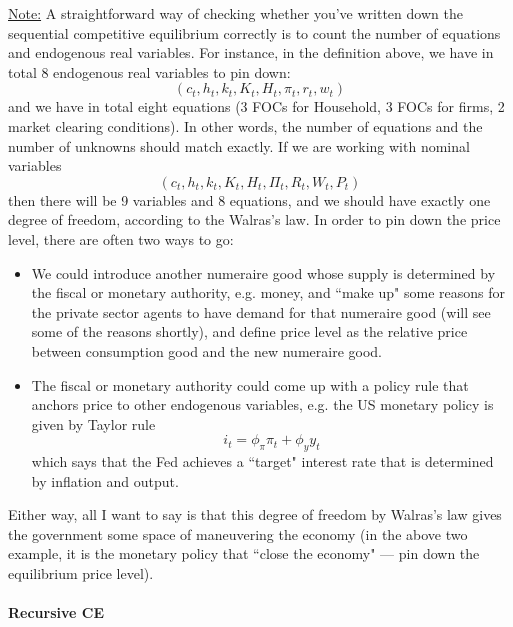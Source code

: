 \documentclass[12pt]{article}
\begin{document}
\underline{Note:} A straightforward way of checking whether you've written down the sequential competitive equilibrium correctly is to count the number of equations and endogenous real variables. For instance, in the definition above, we have in total 8 endogenous real variables to pin down:
\[(c_t, h_t, k_t, K_t, H_t, \pi_t, r_t, w_t)\]
and we have in total eight equations (3 FOCs for Household, 3 FOCs for firms, 2 market clearing conditions). In other words, the number of equations and the number of unknowns should match exactly. If we are working with nominal variables 
\[(c_t, h_t, k_t, K_t, H_t, \Pi_t, R_t, W_t, P_t)\]
then there will be 9 variables and 8 equations, and we should have exactly one degree of freedom, according to the Walras's law. In order to pin down the price level, there are often two ways to go:
\begin{itemize}
	\item We could introduce another numeraire good whose supply is determined by the fiscal or monetary authority, e.g. money, and ``make up" some reasons for the private sector agents to have demand for that numeraire good (will see some of the reasons shortly), and define price level as the relative price between consumption good and the new numeraire good.
	\item The fiscal or monetary authority could come up with a policy rule that anchors price to other endogenous variables, e.g. the US monetary policy is given by Taylor rule
	\[i_t = \phi_\pi \pi_t + \phi_y y_t\]
	which says that the Fed achieves a ``target" interest rate that is determined by inflation and output.
\end{itemize}
Either way, all I want to say is that this degree of freedom by Walras's law gives the government some space of maneuvering the economy (in the above two example, it is the monetary policy that ``close the economy" --- pin down the equilibrium price level).

\paragraph{Recursive CE \\ [6pt]}
\end{document}
